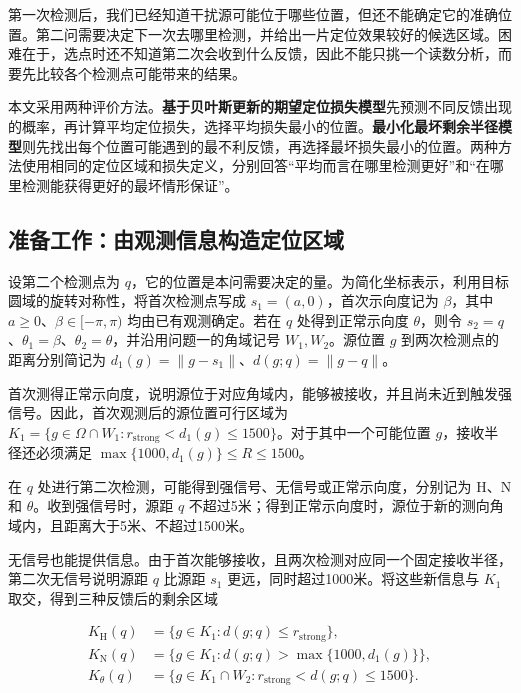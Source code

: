 \documentclass[UTF8,a4paper,zihao=-4,fontset=none]{ctexart}
\begin{document}
第一次检测后，我们已经知道干扰源可能位于哪些位置，但还不能确定它的准确位置。第二问需要决定下一次去哪里检测，并给出一片定位效果较好的候选区域。困难在于，选点时还不知道第二次会收到什么反馈，因此不能只挑一个读数分析，而要先比较各个检测点可能带来的结果。

本文采用两种评价方法。\textbf{基于贝叶斯更新的期望定位损失模型}先预测不同反馈出现的概率，再计算平均定位损失，选择平均损失最小的位置。\textbf{最小化最坏剩余半径模型}则先找出每个位置可能遇到的最不利反馈，再选择最坏损失最小的位置。两种方法使用相同的定位区域和损失定义，分别回答“平均而言在哪里检测更好”和“在哪里检测能获得更好的最坏情形保证”。

\subsection{准备工作：由观测信息构造定位区域}

设第二个检测点为 \(q\)，它的位置是本问需要决定的量。为简化坐标表示，利用目标圆域的旋转对称性，将首次检测点写成 \(s_1=(a,0)\)，首次示向度记为 \(\beta\)，其中 \(a\ge0\)、\(\beta\in[-\pi,\pi)\) 均由已有观测确定。若在 \(q\) 处得到正常示向度 \(\theta\)，则令 \(s_2=q\)、\(\theta_1=\beta\)、\(\theta_2=\theta\)，并沿用问题一的角域记号 \(W_1,W_2\)。源位置 \(g\) 到两次检测点的距离分别简记为 \(d_1(g)=\|g-s_1\|\)、\(d(g;q)=\|g-q\|\)。

首次测得正常示向度，说明源位于对应角域内，能够被接收，并且尚未近到触发强信号。因此，首次观测后的源位置可行区域为 \(K_1=\{g\in\Omega\cap W_1:r_{\mathrm{strong}}<d_1(g)\le1500\}\)。对于其中一个可能位置 \(g\)，接收半径还必须满足 \(\max\{1000,d_1(g)\}\le R\le1500\)。

在 \(q\) 处进行第二次检测，可能得到强信号、无信号或正常示向度，分别记为 \(\mathrm H\)、\(\mathrm N\) 和 \(\theta\)。收到强信号时，源距 \(q\) 不超过5米；得到正常示向度时，源位于新的测向角域内，且距离大于5米、不超过1500米。

无信号也能提供信息。由于首次能够接收，且两次检测对应同一个固定接收半径，第二次无信号说明源距 \(q\) 比源距 \(s_1\) 更远，同时超过1000米。将这些新信息与 \(K_1\) 取交，得到三种反馈后的剩余区域

\begin{equation}
\begin{aligned}
K_{\mathrm H}(q)&=\{g\in K_1:d(g;q)\le r_{\mathrm{strong}}\},\\
K_{\mathrm N}(q)&=\{g\in K_1:d(g;q)>\max\{1000,d_1(g)\}\},\\
K_\theta(q)&=\{g\in K_1\cap W_2:r_{\mathrm{strong}}<d(g;q)\le1500\}.
\end{aligned}
\label{eq:q2-pair-regions}
\end{equation}
\end{document}
